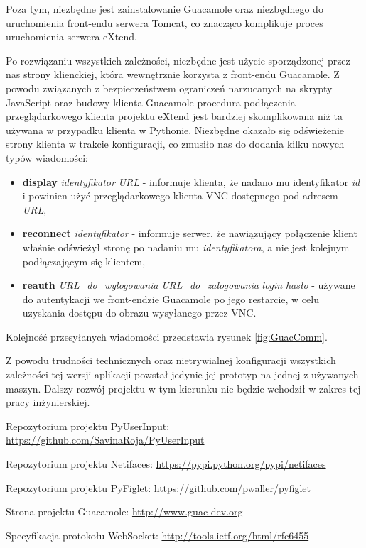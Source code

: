   Poza tym, niezbędne jest zainstalowanie Guacamole oraz niezbędnego do uruchomienia front-endu serwera Tomcat, co znacząco komplikuje proces uruchomienia serwera eXtend.

  Po rozwiązaniu wszystkich zależności, niezbędne jest użycie sporządzonej przez nas strony klienckiej, która wewnętrznie korzysta z front-endu Guacamole. Z powodu związanych z bezpieczeństwem ograniczeń narzucanych na skrypty JavaScript oraz budowy klienta Guacamole procedura podłączenia przeglądarkowego klienta projektu eXtend jest bardziej skomplikowana niż ta używana w przypadku klienta w Pythonie. Niezbędne okazało się odświeżenie strony klienta w trakcie konfiguracji, co zmusiło nas do dodania kilku nowych typów wiadomości:

  \begin{itemize}
    \item \textbf{display} \emph{identyfikator} \emph{URL} - informuje klienta, że nadano mu identyfikator \emph{id} i powinien użyć przeglądarkowego klienta VNC dostępnego pod adresem \emph{URL},
    \item \textbf{reconnect} \emph{identyfikator} - informuje serwer, że nawiązujący połączenie klient właśnie odświeżył stronę po nadaniu mu \emph{identyfikatora}, a nie jest kolejnym podłączającym się klientem,
    \item \textbf{reauth} \emph{URL\_do\_wylogowania} \emph{URL\_do\_zalogowania} \emph{login} \emph{hasło} - używane do autentykacji we front-endzie Guacamole po jego restarcie, w celu uzyskania dostępu do obrazu wysyłanego przez VNC.
  \end{itemize}

  Kolejność przesyłanych wiadomości przedstawia rysunek \ref{fig:GuacComm}.

  Z powodu trudności technicznych oraz nietrywialnej konfiguracji wszystkich zależności tej wersji aplikacji powstał jedynie jej prototyp na jednej z używanych maszyn. Dalszy rozwój projektu w tym kierunku nie będzie wchodził w zakres tej pracy inżynierskiej.
  \vfill


\begin{thebibliography}{9}

    Repozytorium projektu PyUserInput: \url{https://github.com/SavinaRoja/PyUserInput}

    Repozytorium projektu Netifaces: \url{https://pypi.python.org/pypi/netifaces}

    Repozytorium projektu PyFiglet: \url{https://github.com/pwaller/pyfiglet}

    Strona projektu Guacamole: \url{http://www.guac-dev.org}

    Specyfikacja protokołu WebSocket: \url{http://tools.ietf.org/html/rfc6455}

\end{thebibliography}



